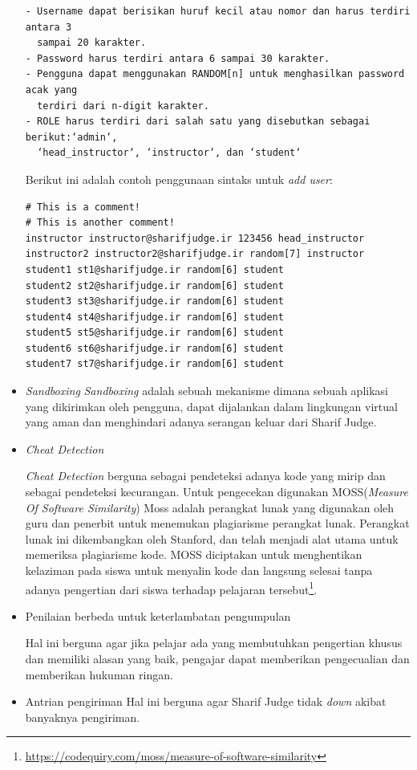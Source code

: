 \begin{itemize}
\begin{verbatim}
- Username dapat berisikan huruf kecil atau nomor dan harus terdiri antara 3 
  sampai 20 karakter.
- Password harus terdiri antara 6 sampai 30 karakter.
- Pengguna dapat menggunakan RANDOM[n] untuk menghasilkan password acak yang
  terdiri dari n-digit karakter.
- ROLE harus terdiri dari salah satu yang disebutkan sebagai berikut:‘admin‘,
  ‘head_instructor‘, ‘instructor‘, dan ‘student‘
    \end{verbatim}
    \vspace{-4mm}
    Berikut ini adalah contoh penggunaan sintaks untuk \textit{add user}:
    \begin{verbatim}
# This is a comment!
# This is another comment!
instructor instructor@sharifjudge.ir 123456 head_instructor
instructor2 instructor2@sharifjudge.ir random[7] instructor
student1 st1@sharifjudge.ir random[6] student
student2 st2@sharifjudge.ir random[6] student
student3 st3@sharifjudge.ir random[6] student
student4 st4@sharifjudge.ir random[6] student
student5 st5@sharifjudge.ir random[6] student
student6 st6@sharifjudge.ir random[6] student
student7 st7@sharifjudge.ir random[6] student
    \end{verbatim}
    \vspace{-5mm}
    \item \textit{Sandboxing}\newline
        \textit{Sandboxing} adalah sebuah mekanisme dimana sebuah aplikasi yang dikirimkan oleh pengguna, dapat dijalankan dalam lingkungan virtual yang aman dan menghindari adanya serangan keluar dari Sharif Judge. \\
    \item \textit{Cheat Detection}
    
    \textit{Cheat Detection} berguna sebagai pendeteksi adanya kode yang mirip dan sebagai pendeteksi kecurangan. Untuk pengecekan digunakan MOSS(\textit{Measure Of Software Similarity}) Moss adalah perangkat lunak yang digunakan oleh guru dan penerbit untuk menemukan plagiarisme perangkat lunak. Perangkat lunak ini dikembangkan oleh Stanford, dan telah menjadi alat utama untuk memeriksa plagiarisme kode. MOSS diciptakan untuk menghentikan kelaziman pada siswa untuk menyalin kode dan langsung selesai tanpa adanya pengertian dari siswa terhadap pelajaran tersebut\footnote{\url{https://codequiry.com/moss/measure-of-software-similarity}}. \\
    \item Penilaian berbeda untuk keterlambatan pengumpulan
    
    Hal ini berguna agar jika pelajar ada yang membutuhkan pengertian khusus dan memiliki alasan yang baik, pengajar dapat memberikan pengecualian dan memberikan hukuman ringan.\\
    \item Antrian pengiriman \newline
    Hal ini berguna agar Sharif Judge tidak \textit{down} akibat banyaknya pengiriman.\\
    

\end{itemize}
